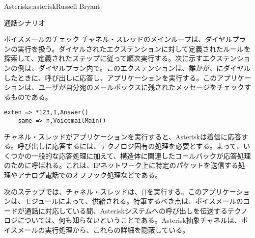 \begin{aosachapter}{Asterisk}{s:asterisk}{Russell Bryant}
\begin{aosasect1}{通話シナリオ}
\begin{aosasect2}{ボイスメールのチェック}
チャネル・スレッドのメインループは、ダイヤルプランの実行を扱う。ダイヤルされたエクステンションに対して定義されたルールを探索して、定義されたステップに従って順次実行する。次に示すエクステンションの例は、ダイヤルプラン内で。このエクステンションは、誰かが、にダイヤルしたときに、呼び出しに応答し、アプリケーションを実行する。このアプリケーションは、ユーザが自分宛のメールボックスに残されたメッセージをチェックするものである。

\begin{verbatim}
exten => *123,1,Answer()
    same => n,VoicemailMain()
\end{verbatim}

\noindent チャネル・スレッドがアプリケーションを実行すると、Asteriskは着信に応答する。呼び出しに応答するには、テクノロジ固有の処理を必要とする。よって、いくつかの一般的な応答処理に加えて、構造体に関連したコールバックが応答処理のために呼ばれる。これは、IPネットワーク上に特定のパケットを送信する処理やアナログ電話でのオフフック処理などである。

次のステップでは、チャネル・スレッドは、()を実行する。このアプリケーションは、モジュールによって、供給される。特筆するべき点は、ボイスメールのコードが通話に対応している間、Asteriskシステムへの呼び出しを伝送するテクノロジについては、何も知らないということである。Asterisk抽象チャネルは、ボイスメールの実行処理から、これらの詳細を隠蔽している。


\end{aosasect2}
\end{aosasect1}
\end{aosachapter}
